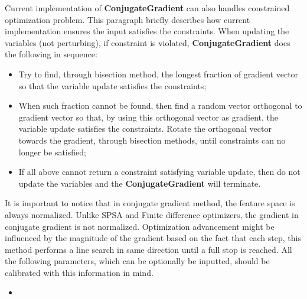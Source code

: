 Current implementation of \textbf{ConjugateGradient} can also handles
constrained optimization problem. This paragraph briefly describes how current implementation ensures the input satisfies the
constraints. When updating the variables (not perturbing), if constraint is violated, \textbf{ConjugateGradient} does the following in
sequence:
\begin{itemize}
\item Try to find, through bisection method, the longest fraction of gradient vector so that the variable update satisfies the
constraints;
\item When such fraction cannot be found, then find a random vector orthogonal to gradient vector so that, by using this
orthogonal vector as gradient, the variable update satisfies the constraints. Rotate the orthogonal vector towards the gradient,
through bisection methods, until constraints can no longer be satisfied;
\item If all above cannot return a constraint satisfying variable update, then do not update the variables and the \textbf{ConjugateGradient} will
terminate.
\end{itemize}

It is important to notice that in conjugate gradient method, the feature space is always normalized. Unlike SPSA and Finite difference
optimizers, the gradient in conjugate gradient is not normalized. Optimization advancement might be influenced by the
magnitude of the gradient based on the fact that each step, this method performs a line search in same direction until a full stop is reached.
All the following parameters, which can be optionally be inputted, should be calibrated with this information in mind.

%

%
\attrsIntro
\vspace{-5mm}
\begin{itemize}
\itemsep0em
\item \nameDescription
\end{itemize}
\vspace{-5mm}

